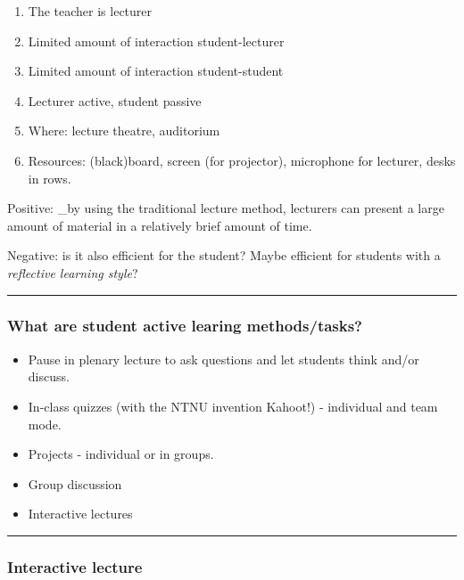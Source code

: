\documentclass[]{article}
\providecommand{\tightlist}{%
  \setlength{\itemsep}{0pt}\setlength{\parskip}{0pt}}
\begin{document}
\begin{enumerate}
\def\labelenumi{\arabic{enumi})}
\tightlist
\item
  The teacher is lecturer
\item
  Limited amount of interaction student-lecturer
\item
  Limited amount of interaction student-student
\item
  Lecturer active, student passive
\item
  Where: lecture theatre, auditorium
\item
  Resources: (black)board, screen (for projector), microphone for
  lecturer, desks in rows.
\end{enumerate}

Positive: \_by using the traditional lecture method, lecturers can
present a large amount of material in a relatively brief amount of time.

Negative: is it also efficient for the student? Maybe efficient for
students with a \emph{reflective learning style}?

\begin{center}\rule{0.5\linewidth}{\linethickness}\end{center}

\hypertarget{what-are-student-active-learing-methodstasks}{%
\subsubsection{What are student active learing
methods/tasks?}\label{what-are-student-active-learing-methodstasks}}

\begin{itemize}
\tightlist
\item
  Pause in plenary lecture to ask questions and let students think
  and/or discuss.
\item
  In-class quizzes (with the NTNU invention Kahoot!) - individual and
  team mode.
\item
  Projects - individual or in groups.
\item
  Group discussion
\item
  Interactive lectures
\end{itemize}

\begin{center}\rule{0.5\linewidth}{\linethickness}\end{center}

\hypertarget{interactive-lecture}{%
\subsubsection{Interactive lecture}\label{interactive-lecture}}
\end{document}
